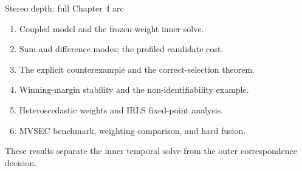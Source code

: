 \begin{frame}{Stereo depth: full Chapter 4 arc}
\hypertarget{stereoarc}{}
\begin{enumerate}\small
\item Coupled model and the frozen-weight inner solve.
\item Sum and difference modes; the profiled candidate cost.
\item The explicit counterexample and the correct-selection theorem.
\item Winning-margin stability and the non-identifiability example.
\item Heteroscedastic weights and IRLS fixed-point analysis.
\item MVSEC benchmark, weighting comparison, and hard fusion.
\end{enumerate}
\vspace{1mm}
These results separate the inner temporal solve from the outer correspondence decision.
\end{frame}

